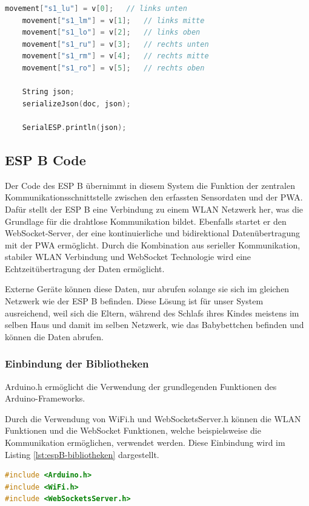 \begin{lstlisting}[language=C++, caption={Sensorwerte}, label={lst:espA-sensorwerte}, firstnumber=51]
    movement["s1_lu"] = v[0];   // links unten
    movement["s1_lm"] = v[1];   // links mitte
    movement["s1_lo"] = v[2];   // links oben
    movement["s1_ru"] = v[3];   // rechts unten
    movement["s1_rm"] = v[4];   // rechts mitte
    movement["s1_ro"] = v[5];   // rechts oben

    String json;
    serializeJson(doc, json);   

    SerialESP.println(json);
\end{lstlisting}

\subsection[ESP B Code]{ESP B Code}
Der Code des ESP B übernimmt in diesem System die Funktion der zentralen Kommunikationsschnittstelle zwischen den erfassten Sensordaten und der PWA.  Dafür stellt der ESP B eine Verbindung zu einem WLAN Netzwerk her, was die Grundlage für die drahtlose Kommunikation bildet. Ebenfalls startet er den WebSocket-Server, der eine kontinuierliche und bidirektional Datenübertragung mit der PWA ermöglicht. Durch die Kombination aus serieller Kommunikation, stabiler WLAN Verbindung und WebSocket Technologie wird eine Echtzeitübertragung der Daten ermöglicht.

\noindent
Externe Geräte können diese Daten, nur abrufen solange sie sich im gleichen Netzwerk wie der ESP B befinden. Diese Lösung ist für unser System ausreichend, weil sich die Eltern, während des Schlafs ihres Kindes meistens im selben Haus und damit im selben Netzwerk, wie das Babybettchen befinden und können die Daten abrufen. 

\subsubsection{Einbindung der Bibliotheken}
Arduino.h ermöglicht die Verwendung der grundlegenden Funktionen des Arduino-Frameworks.

\noindent
Durch die Verwendung von WiFi.h und WebSocketsServer.h können die WLAN Funktionen und die WebSocket Funktionen, welche beispielsweise die Kommunikation ermöglichen, verwendet werden.
Diese Einbindung wird im Listing \ref{lst:espB-bibliotheken} dargestellt.

\begin{lstlisting}[language=C++, caption={Einbindung von Bibliotheken - ESP B}, label={lst:espB-bibliotheken}, firstnumber=1]
#include <Arduino.h>
#include <WiFi.h>
#include <WebSocketsServer.h>
\end{lstlisting}

